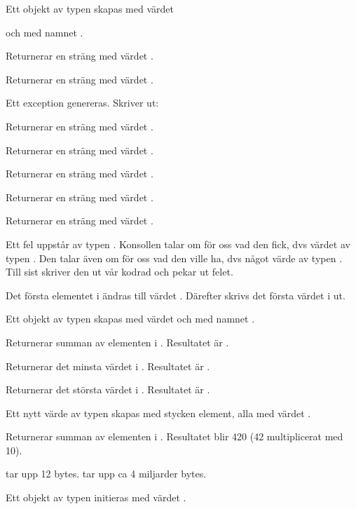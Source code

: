 \Subtask Ett objekt av typen  skapas med värdet 

 och med namnet .

\Subtask Returnerar en sträng med värdet .

\Subtask Returnerar en sträng med värdet \code{!}.

\Subtask Ett exception genereras. Skriver ut:


\Subtask Returnerar en sträng med värdet .

\Subtask Returnerar en sträng med värdet .

\Subtask Returnerar en sträng med värdet .

\Subtask Returnerar en sträng med värdet .

\Subtask Returnerar en sträng med värdet .

\Subtask Ett fel uppstår av typen . Konsollen talar om för oss vad den fick, dvs värdet  av typen . Den talar även om för oss vad den ville ha, dvs något värde av typen . Till sist skriver den ut vår kodrad och pekar ut felet.

\Subtask Det första elementet i  ändras till värdet . Därefter skrivs det första värdet i  ut.

\Subtask Ett objekt av typen  skapas med värdet  och med namnet .

\Subtask Returnerar summan av elementen i . Resultatet är .

\Subtask Returnerar det minsta värdet i . Resultatet är .

\Subtask Returnerar det största värdet i . Resultatet är .

\Subtask Ett nytt värde av typen  skapas med  stycken element, alla med värdet .

\Subtask Returnerar summan av elementen i . Resultatet blir 420 (42 multiplicerat med 10).

\Subtask {} tar upp 12 bytes.  tar upp ca 4 miljarder bytes.

\Task 

\Subtask Ett objekt av typen  initieras med värdet .

